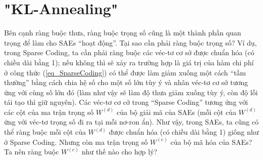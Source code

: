 \section{"KL-Annealing"}
Bên cạnh ràng buộc thưa, ràng buộc trọng số cũng là một thành phần quan trọng để làm cho SAEs ``hoạt động''. Tại sao cần phải ràng buộc trọng số? Ví dụ, trong Sparse Coding, ta cần phải ràng buộc các véc-tơ cơ sở được chuẩn hóa (có chiều dài bằng 1); nếu không thì sẽ xảy ra trường hợp là giá trị của hàm chi phí ở công thức (\ref{eq_SparseCoding}) có thể được làm giảm xuống một cách ``tầm thường'' bằng cách chia hệ số cho một số lớn tùy ý và nhân véc-tơ cơ sở tương ứng với cùng số lớn đó (làm như vậy sẽ làm độ thưa giảm xuống tùy ý, còn độ lỗi tái tạo thì giữ nguyên). Các véc-tơ cơ cở trong ``Sparse Coding'' tương ứng với các cột của ma trận trọng số $W^{(d)}$ của bộ giải mã của SAEs (mỗi cột của $W^{(d)}$ ứng với véc-tơ trọng số đi ra tại mỗi nơ-ron ẩn). Như vậy, trong SAEs, ta cũng có thể ràng buộc mỗi cột của $W^{(d)}$ được chuẩn hóa (có chiều dài bằng 1) giống như ở Sparse Coding. Nhưng còn ma trận trọng số $W^{(e)}$ của bộ mã hóa của SAEs? Ta nên ràng buộc $W^{(e)}$ như thế nào cho hợp lý?

